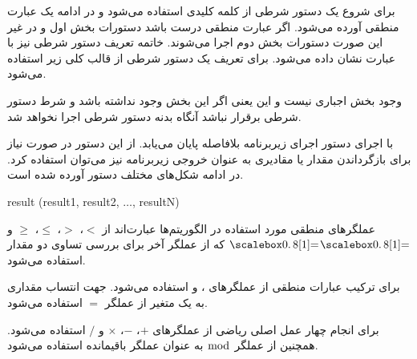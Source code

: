 \begin{latin}
\begin{algorithmic}[1]
	\State	{}
\EndWhile
\end{algorithmic}
\end{latin}


برای شروع یک دستور شرطی از کلمه کلیدی {} استفاده می‌شود و در ادامه یک عبارت منطقی آورده می‌شود. اگر عبارت منطقی درست باشد دستورات بخش اول و در غیر این صورت دستورات بخش دوم اجرا می‌شوند. خاتمه تعریف دستور شرطی نیز با  عبارت {} نشان داده می‌شود. برای تعریف یک دستور شرطی از قالب کلی زیر استفاده می‌شود.

\begin{latin}
\begin{algorithmic}[1]
	\State	{}
\Else
	\State	{}
\EndIf
\end{algorithmic}
\end{latin}

وجود بخش {} اجباری نیست و این یعنی اگر این بخش وجود نداشته باشد و شرط دستور شرطی برقرار نباشد آنگاه بدنه دستور شرطی اجرا نخواهد شد.


با اجرای دستور {} اجرای زیربرنامه بلافاصله پایان می‌یابد. از این دستور در صورت نیاز برای بازگرداندن مقدار یا مقادیری به عنوان خروجی زیربرنامه نیز می‌توان استفاده کرد. در ادامه شکل‌های مختلف دستور {} آورده شده است.

\begin{latin}
\begin{algorithmic}[1]
\State	\Return
\State	\Return result
\State	\Return (result1, result2, $\ldots$, resultN)
\end{algorithmic}
\end{latin}

عملگرهای منطقی مورد استفاده در الگوریتم‌ها عبارت‌اند از {$<$}، {$>$}، {$\leq$}، {$\geq$} و {$\isequal$} که از عملگر آخر برای بررسی تساوی دو مقدار استفاده می‌شود.

برای ترکیب عبارات منطقی از عملگرهای {}، {} و {} استفاده می‌شود. جهت انتساب مقداری به یک متغیر از عملگر {$=$} استفاده می‌شود.

برای انجام چهار عمل اصلی ریاضی از عملگرهای {$+$}، {$-$}، {$\times$} و {$/$} استفاده می‌شود. همچنین از عملگر {$\bmod$} به عنوان عملگر باقیمانده استفاده می‌شود.